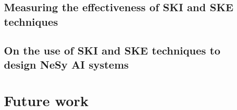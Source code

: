 \subsection*{Measuring the effectiveness of \gls{SKI} and \gls{SKE} techniques}


\subsection*{On the use of \gls{SKI} and \gls{SKE} techniques to design \gls{NeSy} \gls{AI} systems}


\section{Future work}\label{sec:future-work}